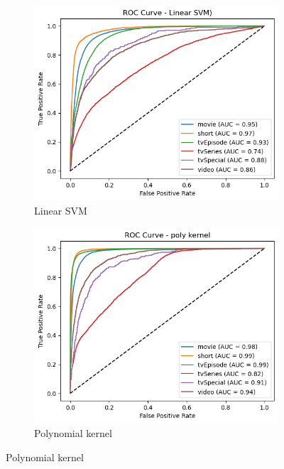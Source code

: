 \begin{figure}[h]
    \centering
    \begin{subfigure}[b]{0.24\textwidth}
        \centering
        \includegraphics[width=\textwidth]{plotsss/roc_linear.png}
        \caption{Linear SVM}
        \label{fig:roc_linear}
    \end{subfigure}
    \begin{subfigure}[b]{0.24\textwidth}
        \centering
        \includegraphics[width=\textwidth]{plotsss/roc_poly.png}
        \caption{Polynomial kernel}
        \label{fig:roc_poly}

\end{subfigure}
\end{figure}
